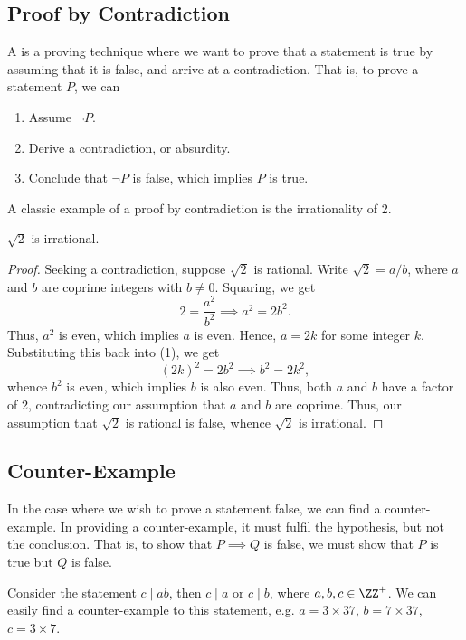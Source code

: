 \subsection{Proof by Contradiction}

A  is a proving technique where we want to prove that a statement is true by assuming that it is false, and arrive at a contradiction. That is, to prove a statement $P$, we can 
\renewcommand{\theenumi}{\arabic{enumi}.}
\begin{enumerate}
    \item Assume $\lnot P$.
    \item Derive a contradiction, or absurdity.
    \item Conclude that $\lnot P$ is false, which implies $P$ is true.
\end{enumerate}
\renewcommand{\theenumi}{(\alph{enumi})}

A classic example of a proof by contradiction is the irrationality of 2.

\begin{statement}
    $\sqrt2$ is irrational.
\end{statement}
\begin{proof}
    Seeking a contradiction, suppose $\sqrt2$ is rational. Write $\sqrt2 = a/b$, where $a$ and $b$ are coprime integers with $b \neq 0$. Squaring, we get \[2 = \frac{a^2}{b^2} \implies a^2 = 2b^2. \tag{1}\] Thus, $a^2$ is even, which implies $a$ is even. Hence, $a = 2k$ for some integer $k$. Substituting this back into (1), we get \[(2k)^2 = 2b^2 \implies b^2 = 2k^2,\] whence $b^2$ is even, which implies $b$ is also even. Thus, both $a$ and $b$ have a factor of 2, contradicting our assumption that $a$ and $b$ are coprime. Thus, our assumption that $\sqrt2$ is rational is false, whence $\sqrt2$ is irrational.
\end{proof}

\subsection{Counter-Example}

In the case where we wish to prove a statement false, we can find a counter-example. In providing a counter-example, it must fulfil the hypothesis, but not the conclusion. That is, to show that $P \implies Q$ is false, we must show that $P$ is true but $Q$ is false.

\begin{example}
    Consider the statement $c \mid ab$, then $c \mid a$ or $c \mid b$, where $a, b, c \in \ZZ^+$. We can easily find a counter-example to this statement, e.g. $a = 3 \times 37$, $b = 7 \times 37$, $c = 3 \times 7$.
\end{example}